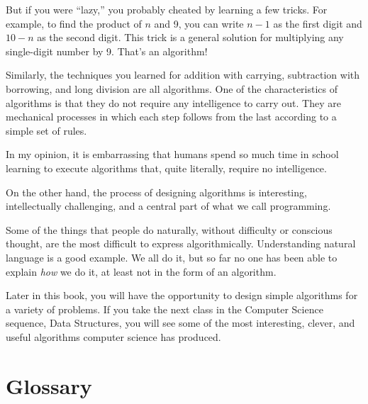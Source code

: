 But if you were ``lazy,'' you probably cheated by learning a few
tricks.  For example, to find the product of $n$ and 9, you can write
$n-1$ as the first digit and $10-n$ as the second digit.  This trick
is a general solution for multiplying any single-digit number by 9.
That's an algorithm!

Similarly, the techniques you learned for addition with carrying,
subtraction with borrowing, and long division are all algorithms.  One
of the characteristics of algorithms is that they do not require any
intelligence to carry out.  They are mechanical processes in which
each step follows from the last according to a simple set of rules.

In my opinion, it is embarrassing that humans spend so much time in
school learning to execute algorithms that, quite literally, require
no intelligence.

On the other hand, the process of designing algorithms is interesting,
intellectually challenging, and a central part of what we call
programming.

Some of the things that people do naturally, without difficulty
or conscious thought, are the most difficult to express
algorithmically.  Understanding natural language is a good
example.  We all do it, but so far no one has been able to
explain {\em how} we do it, at least not in the form of an
algorithm.

Later in this book, you will have the opportunity to design
simple algorithms for a variety of problems.  If you take
the next class in the Computer Science sequence, Data Structures,
you will see some of the most interesting, clever, and
useful algorithms computer science has produced.

\section{Glossary}

